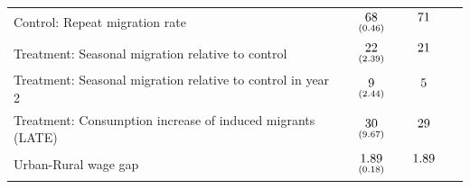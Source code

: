\documentclass[12pt,pdftex]{article}
\begin{document}
\begin{table}[t]
\begin{center}
\begin{tabular}{l l c c}
 Control: Repeat migration rate&
$\begin{array}{c}68\vspace{-.15cm}\\ \scriptstyle (0.46)\end{array}$ &
$\begin{array}{c}71\vspace{-.15cm}\\ \scriptstyle \phantom{(0.46)}\end{array}$ & \\

Treatment: Seasonal migration relative to control &
 $\begin{array}{c}22\vspace{-.15cm}\\ \scriptstyle (2.39)\end{array}$ &
$\begin{array}{c}21\vspace{-.15cm}\\ \scriptstyle \phantom{(2.39)}\end{array}$ & \\


Treatment: Seasonal migration relative to control in year 2 &
 $\begin{array}{c}9\vspace{-.15cm}\\ \scriptstyle (2.44)\end{array}$ &
$\begin{array}{c}5\vspace{-.15cm}\\ \scriptstyle \phantom{(2.44)}\end{array}$ & \\


Treatment: Consumption increase of induced migrants (LATE)  &
$\begin{array}{c}30\vspace{-.15cm}\\ \scriptstyle (9.67)\end{array}$ &
$\begin{array}{c}29\vspace{-.15cm}\\ \scriptstyle \phantom{(9.67)}\end{array}$ & \\

\hline
Urban-Rural wage gap &
$\begin{array}{c}1.89\vspace{-.15cm}\\ \scriptstyle (0.18)\end{array}$ &
$\begin{array}{c}1.89\vspace{-.15cm}\\ \scriptstyle \phantom{(0.18)}\end{array}$ & \\


\end{tabular}
\end{center}
\end{table}
\end{document}
